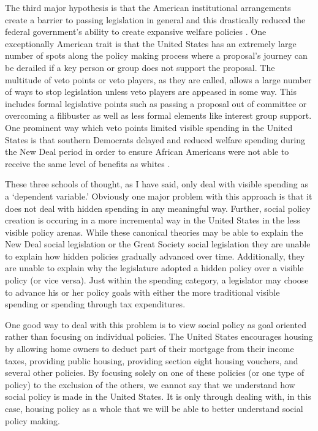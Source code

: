 \documentclass[12pt]{article}
\begin{document}
The third major hypothesis is that the American institutional arrangements create a barrier to passing legislation in general and this drastically reduced the federal government's ability to create expansive welfare policies \citep{pierson1995, robertson2011}. One exceptionally American trait is that the United States has an extremely large number of spots along the policy making process where a proposal's journey can be derailed if a key person or group does not support the proposal. The multitude of veto points or veto players, as they are called, allows a large number of ways to stop legislation unless veto players are appeased in some way. This includes formal legislative points such as passing a proposal out of committee or overcoming a filibuster as well as less formal elements like interest group support. One prominent way which veto points limited visible spending in the United States is that southern Democrats delayed and reduced welfare spending during the New Deal period in order to ensure African Americans were not able to receive the same level of benefits as whites \citep{katznelson2013}. 

These three schools of thought, as I have said, only deal with visible spending as a `dependent variable.' Obviously one major problem with this approach is that it does not deal with hidden spending in any meaningful way. Further, social policy creation is occuring in a more incremental way in the United States in the less visible policy arenas. While these canonical theories may be able to explain the New Deal social legislation or the Great Society social legislation they are unable to explain how hidden policies gradually advanced over time. Additionally, they are unable to explain why the legislature adopted a hidden policy over a visible policy (or vice versa). Just within the spending category, a legislator may choose to advance his or her policy goals with either the more traditional visible spending or spending through tax expenditures.

One good way to deal with this problem is to view social policy as goal oriented rather than focusing on individual policies. The United States encourages housing by allowing home owners to deduct part of their mortgage from their income taxes, providing public housing, providing section eight housing vouchers, and several other policies. By focusing solely on one of these policies (or one type of policy) to the exclusion of the others, we cannot say that we understand how social policy is made in the United States. It is only through dealing with, in this case, housing policy as a whole that we will be able to better understand social policy making.
\end{document}
